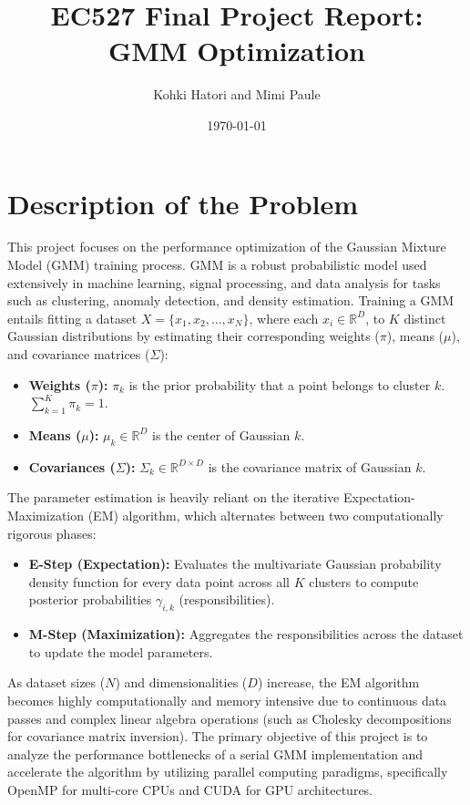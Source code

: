 \documentclass[10pt]{article}
\title{EC527 Final Project Report: GMM Optimization}
\author{Kohki Hatori and Mimi Paule}
\date{\today}
\begin{document}
\maketitle

\tableofcontents
\newpage

\section{Description of the Problem}
This project focuses on the performance optimization of the Gaussian Mixture Model (GMM) training process. GMM is a robust probabilistic model used extensively in machine learning, signal processing, and data analysis for tasks such as clustering, anomaly detection, and density estimation. Training a GMM entails fitting a dataset $X = \{x_1, x_2, \dots, x_N\}$, where each $x_i \in \mathbb{R}^D$, to $K$ distinct Gaussian distributions by estimating their corresponding weights ($\pi$), means ($\mu$), and covariance matrices ($\Sigma$):

\begin{itemize}
    \item \textbf{Weights ($\pi$):} $\pi_k$ is the prior probability that a point belongs to cluster $k$. $\sum_{k=1}^K \pi_k = 1$.
    \item \textbf{Means ($\mu$):} $\mu_k \in \mathbb{R}^D$ is the center of Gaussian $k$.
    \item \textbf{Covariances ($\Sigma$):} $\Sigma_k \in \mathbb{R}^{D \times D}$ is the covariance matrix of Gaussian $k$.
\end{itemize}

The parameter estimation is heavily reliant on the iterative Expectation-Maximization (EM) algorithm, which alternates between two computationally rigorous phases:
\begin{itemize}
    \item \textbf{E-Step (Expectation):} Evaluates the multivariate Gaussian probability density function for every data point across all $K$ clusters to compute posterior probabilities $\gamma_{i,k}$ (responsibilities).
    \item \textbf{M-Step (Maximization):} Aggregates the responsibilities across the dataset to update the model parameters.
\end{itemize}

As dataset sizes ($N$) and dimensionalities ($D$) increase, the EM algorithm becomes highly computationally and memory intensive due to continuous data passes and complex linear algebra operations (such as Cholesky decompositions for covariance matrix inversion). The primary objective of this project is to analyze the performance bottlenecks of a serial GMM implementation and accelerate the algorithm by utilizing parallel computing paradigms, specifically OpenMP for multi-core CPUs and CUDA for GPU architectures.
\end{document}
